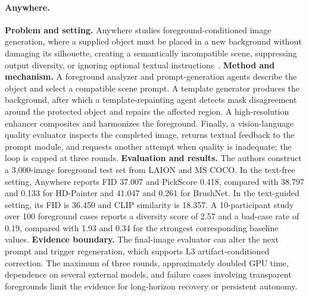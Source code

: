 \paragraph{Anywhere.}
\textbf{Problem and setting.} Anywhere studies foreground-conditioned image generation, where a supplied object must be placed in a new background without damaging its silhouette, creating a semantically incompatible scene, suppressing output diversity, or ignoring optional textual instructions~\cite{xie2024anywhere}. \textbf{Method and mechanism.} A foreground analyzer and prompt-generation agents describe the object and select a compatible scene prompt. A template generator produces the background, after which a template-repainting agent detects mask disagreement around the protected object and repairs the affected region. A high-resolution enhancer composites and harmonizes the foreground. Finally, a vision-language quality evaluator inspects the completed image, returns textual feedback to the prompt module, and requests another attempt when quality is inadequate; the loop is capped at three rounds. \textbf{Evaluation and results.} The authors construct a 3,000-image foreground test set from LAION and MS COCO. In the text-free setting, Anywhere reports FID 37.007 and PickScore 0.418, compared with 38.797 and 0.133 for HD-Painter and 41.047 and 0.261 for BrushNet. In the text-guided setting, its FID is 36.450 and CLIP similarity is 18.357. A 10-participant study over 100 foreground cases reports a diversity score of 2.57 and a bad-case rate of 0.19, compared with 1.93 and 0.34 for the strongest corresponding baseline values. \textbf{Evidence boundary.} The final-image evaluator can alter the next prompt and trigger regeneration, which supports L3 artifact-conditioned correction. The maximum of three rounds, approximately doubled GPU time, dependence on several external models, and failure cases involving transparent foregrounds limit the evidence for long-horizon recovery or persistent autonomy.

